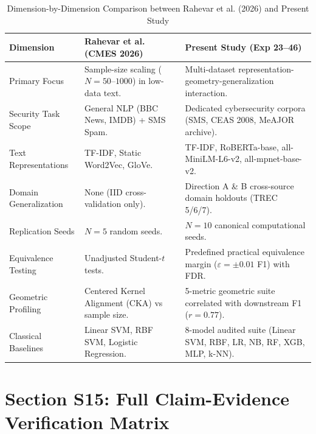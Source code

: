 \documentclass[10pt,letterpaper]{article}
\begin{document}
\begin{table}[h!]
\centering
\small
\caption{Dimension-by-Dimension Comparison between Rahevar et al. (2026) and Present Study}
\label{tab:supp_rahevar_diff}
\begin{tabular}{p{3.2cm}p{5.5cm}p{5.5cm}}
\toprule
\textbf{Dimension} & \textbf{Rahevar et al. (CMES 2026)} & \textbf{Present Study (Exp 23--46)} \\
\midrule
Primary Focus & Sample-size scaling ($N = 50\text{--}1000$) in low-data text. & Multi-dataset representation-geometry-generalization interaction. \\
Security Task Scope & General NLP (BBC News, IMDB) + SMS Spam. & Dedicated cybersecurity corpora (SMS, CEAS 2008, MeAJOR archive). \\
Text Representations & TF-IDF, Static Word2Vec, GloVe. & TF-IDF, RoBERTa-base, all-MiniLM-L6-v2, all-mpnet-base-v2. \\
Domain Generalization & None (IID cross-validation only). & Direction A \& B cross-source domain holdouts (TREC 5/6/7). \\
Replication Seeds & $N = 5$ random seeds. & $N = 10$ canonical computational seeds. \\
Equivalence Testing & Unadjusted Student-$t$ tests. & Predefined practical equivalence margin ($\varepsilon = \pm 0.01$ F1) with FDR. \\
Geometric Profiling & Centered Kernel Alignment (CKA) vs sample size. & 5-metric geometric suite correlated with downstream F1 ($r=0.77$). \\
Classical Baselines & Linear SVM, RBF SVM, Logistic Regression. & 8-model audited suite (Linear SVM, RBF, LR, NB, RF, XGB, MLP, k-NN). \\
\bottomrule
\end{tabular}
\end{table}

\section{Section S15: Full Claim-Evidence Verification Matrix}
\label{sec:supp_matrix}
\end{document}
